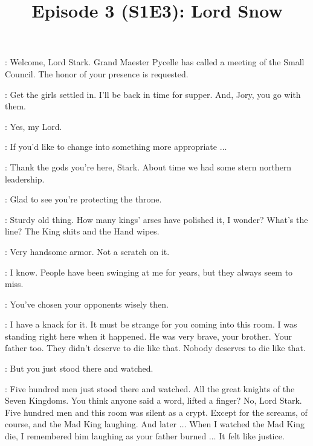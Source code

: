 

\title{Episode 3 (S1E3): Lord Snow}
\author{}
\date{}
\maketitle



\scene



\PAGE: Welcome, Lord Stark. Grand Maester Pycelle has called a meeting of the Small Council. The honor of your presence is requested. 

\NED: Get the girls settled in. I'll be back in time for supper. And, Jory, you go with them. 

\JORY: Yes, my Lord. 

\PAGE: If you'd like to change into something more appropriate $\ldots$ 


\scene



\JAIME: Thank the gods you're here, Stark. About time we had some stern northern leadership. 

\NED: Glad to see you're protecting the throne. 

\JAIME: Sturdy old thing. How many kings' arses have polished it, I wonder? What's the line? The King shits and the Hand wipes. 

\NED: Very handsome armor. Not a scratch on it. 

\JAIME: I know. People have been swinging at me for years, but they always seem to miss. 

\NED: You've chosen your opponents wisely then. 

\JAIME: I have a knack for it. It must be strange for you coming into this room. I was standing right here when it happened. He was very brave, your brother. Your father too. They didn't deserve to die like that. Nobody deserves to die like that. 

\NED: But you just stood there and watched. 

\JAIME: Five hundred men just stood there and watched. All the great knights of the Seven Kingdoms. You think anyone said a word, lifted a finger? No, Lord Stark. Five hundred men and this room was silent as a crypt. Except for the screams, of course, and the Mad King laughing. And later $\ldots$ When I watched the Mad King die, I remembered him laughing as your father burned $\ldots$ It felt like justice. 

